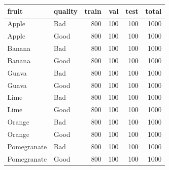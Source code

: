 \begin{tabular}{llrrrr}
\toprule
fruit & quality & train & val & test & total \\
\midrule
Apple & Bad & 800 & 100 & 100 & 1000 \\
Apple & Good & 800 & 100 & 100 & 1000 \\
Banana & Bad & 800 & 100 & 100 & 1000 \\
Banana & Good & 800 & 100 & 100 & 1000 \\
Guava & Bad & 800 & 100 & 100 & 1000 \\
Guava & Good & 800 & 100 & 100 & 1000 \\
Lime & Bad & 800 & 100 & 100 & 1000 \\
Lime & Good & 800 & 100 & 100 & 1000 \\
Orange & Bad & 800 & 100 & 100 & 1000 \\
Orange & Good & 800 & 100 & 100 & 1000 \\
Pomegranate & Bad & 800 & 100 & 100 & 1000 \\
Pomegranate & Good & 800 & 100 & 100 & 1000 \\
\bottomrule
\end{tabular}
